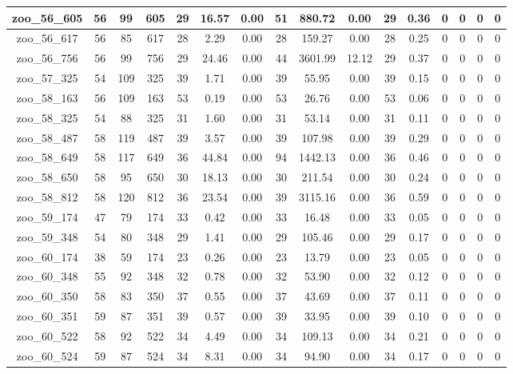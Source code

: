 \begin{landscape}
\begin{longtable}{|c|c|c|c|c|c|c|c|c|c|c|c|c|c|c|c|}
zoo\_56\_605 & 56 & 99 & 605 & 29 & 16.57 & 0.00 & 51 & 880.72 & 0.00 & 29 & 0.36 & 0 & 0 & 0 & 0 \\ \hline 
zoo\_56\_617 & 56 & 85 & 617 & 28 & 2.29 & 0.00 & 28 & 159.27 & 0.00 & 28 & 0.25 & 0 & 0 & 0 & 0 \\ \hline 
zoo\_56\_756 & 56 & 99 & 756 & 29 & 24.46 & 0.00 & 44 & 3601.99 & 12.12 & 29 & 0.37 & 0 & 0 & 0 & 0 \\ \hline 
zoo\_57\_325 & 54 & 109 & 325 & 39 & 1.71 & 0.00 & 39 & 55.95 & 0.00 & 39 & 0.15 & 0 & 0 & 0 & 0 \\ \hline 
zoo\_58\_163 & 56 & 109 & 163 & 53 & 0.19 & 0.00 & 53 & 26.76 & 0.00 & 53 & 0.06 & 0 & 0 & 0 & 0 \\ \hline 
zoo\_58\_325 & 54 & 88 & 325 & 31 & 1.60 & 0.00 & 31 & 53.14 & 0.00 & 31 & 0.11 & 0 & 0 & 0 & 0 \\ \hline 
zoo\_58\_487 & 58 & 119 & 487 & 39 & 3.57 & 0.00 & 39 & 107.98 & 0.00 & 39 & 0.29 & 0 & 0 & 0 & 0 \\ \hline 
zoo\_58\_649 & 58 & 117 & 649 & 36 & 44.84 & 0.00 & 94 & 1442.13 & 0.00 & 36 & 0.46 & 0 & 0 & 0 & 0 \\ \hline 
zoo\_58\_650 & 58 & 95 & 650 & 30 & 18.13 & 0.00 & 30 & 211.54 & 0.00 & 30 & 0.24 & 0 & 0 & 0 & 0 \\ \hline 
zoo\_58\_812 & 58 & 120 & 812 & 36 & 23.54 & 0.00 & 39 & 3115.16 & 0.00 & 36 & 0.59 & 0 & 0 & 0 & 0 \\ \hline 
zoo\_59\_174 & 47 & 79 & 174 & 33 & 0.42 & 0.00 & 33 & 16.48 & 0.00 & 33 & 0.05 & 0 & 0 & 0 & 0 \\ \hline 
zoo\_59\_348 & 54 & 80 & 348 & 29 & 1.41 & 0.00 & 29 & 105.46 & 0.00 & 29 & 0.17 & 0 & 0 & 0 & 0 \\ \hline 
zoo\_60\_174 & 38 & 59 & 174 & 23 & 0.26 & 0.00 & 23 & 13.79 & 0.00 & 23 & 0.05 & 0 & 0 & 0 & 0 \\ \hline 
zoo\_60\_348 & 55 & 92 & 348 & 32 & 0.78 & 0.00 & 32 & 53.90 & 0.00 & 32 & 0.12 & 0 & 0 & 0 & 0 \\ \hline 
zoo\_60\_350 & 58 & 83 & 350 & 37 & 0.55 & 0.00 & 37 & 43.69 & 0.00 & 37 & 0.11 & 0 & 0 & 0 & 0 \\ \hline 
zoo\_60\_351 & 59 & 87 & 351 & 39 & 0.57 & 0.00 & 39 & 33.95 & 0.00 & 39 & 0.10 & 0 & 0 & 0 & 0 \\ \hline 
zoo\_60\_522 & 58 & 92 & 522 & 34 & 4.49 & 0.00 & 34 & 109.13 & 0.00 & 34 & 0.21 & 0 & 0 & 0 & 0 \\ \hline 
zoo\_60\_524 & 59 & 87 & 524 & 34 & 8.31 & 0.00 & 34 & 94.90 & 0.00 & 34 & 0.17 & 0 & 0 & 0 & 0 \\ \hline 

\end{longtable}
\end{landscape}
